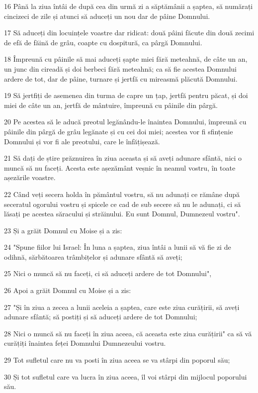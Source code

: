 \par 16 Până la ziua întâi de după cea din urmă zi a săptămânii a șaptea, să numărați cincizeci de zile și atunci să aduceți un nou dar de pâine Domnului.
\par 17 Să aduceți din locuințele voastre dar ridicat: două pâini făcute din două zecimi de efă de făină de grâu, coapte cu dospitură, ca pârgă Domnului.
\par 18 Împreună cu pâinile să mai aduceți șapte miei fără meteahnă, de câte un an, un junc din cireadă și doi berbeci fără meteahnă; ca să fie acestea Domnului ardere de tot, dar de pâine, turnare și jertfă cu mireasmă plăcută Domnului.
\par 19 Să jertfiți de asemenea din turma de capre un țap, jertfă pentru păcat, și doi miei de câte un an, jertfă de mântuire, împreună cu pâinile din pârgă.
\par 20 Pe acestea să le aducă preotul legănându-le înaintea Domnului, împreună cu pâinile din pârgă de grâu legănate și cu cei doi miei; acestea vor fi sfințenie Domnului și vor fi ale preotului, care le înfățișează.
\par 21 Să dați de știre prăznuirea în ziua aceasta și să aveți adunare sfântă, nici o muncă să nu faceți. Acesta este așezământ veșnic în neamul vostru, în toate așezările voastre.
\par 22 Când veți secera holda în pământul vostru, să nu adunați ce rămâne după seceratul ogorului vostru și spicele ce cad de sub secere să nu le adunați, ci să lăsați pe acestea săracului și străinului. Eu sunt Domnul, Dumnezeul vostru".
\par 23 Și a grăit Domnul cu Moise și a zis:
\par 24 "Spune fiilor lui Israel: În luna a șaptea, ziua întâi a lunii să vă fie zi de odihnă, sărbătoarea trâmbițelor și adunare sfântă să aveți;
\par 25 Nici o muncă să nu faceți, ci să aduceți ardere de tot Domnului",
\par 26 Apoi a grăit Domnul cu Moise și a zis:
\par 27 "Și în ziua a zecea a lunii aceleia a șaptea, care este ziua curățirii, să aveți adunare sfântă; să postiți și să aduceți ardere de tot Domnului;
\par 28 Nici o muncă să nu faceți în ziua aceea, că aceasta este ziua curățirii" ca să vă curățiți înaintea feței Domnului Dumnezeului vostru.
\par 29 Tot sufletul care nu va posti în ziua aceea se va stârpi din poporul său;
\par 30 Și tot sufletul care va lucra în ziua aceea, îl voi stârpi din mijlocul poporului său.
